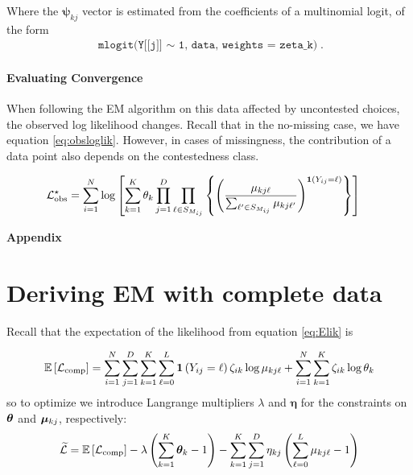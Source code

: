 \documentclass[11pt]{article}
\begin{document}
Where the \(\bm\psi_{kj}\) vector is estimated from the coefficients of a multinomial logit, of the form 
\begin{align*}
\texttt{mlogit(Y[[j]] \(\sim\) 1, data, weights = zeta\_k)}.
\end{align*}

\paragraph{Evaluating Convergence} When following the EM algorithm on this data affected by uncontested choices, the observed log likelihood changes. Recall that in the no-missing case,  we have equation \ref{eq:obsloglik}. However, in cases of missingness, the contribution of a data point also depends on the contestedness class.

\begin{align*}
{\mathcal{L}}^{\star}_{\text{obs}} &= \sum^{N}_{i=1}\log \left[\sum^{K}_{k=1}\theta_k \prod^{D}_{j=1}\prod_{\ell \in S_{M_{ij}}}\left\{\left(\frac{\mu_{kj\ell}}{\sum_{\ell^\prime \in S_{M_{ij}}} \mu_{kj\ell^\prime}}\right)^{\bm{1}\left(Y_{ij} = \ell\right)}\right\}\right]
\end{align*}


\newpage
\appendix

\begin{centering}
\textbf{\large{Appendix}}
\end{centering}

\section{Deriving EM with complete data}

Recall that the expectation of the likelihood from equation \ref{eq:Elik} is

\begin{align*}
\mathbb{E}\left[\mathcal{L}_{\text{comp}}\right] = \sum^{N}_{i=1}\sum^{D}_{j=1}\sum^{K}_{k=1}\sum^{L}_{\ell = 0}\bm{1}\left(Y_{ij} = \ell\right) \zeta_{ik}\log\mu_{kj\ell} +  
\sum^{N}_{i=1}\sum^{K}_{k=1}\zeta_{ik}\log \theta_{k}
\end{align*}
so to optimize we introduce Langrange multipliers \(\lambda\) and \(\bm{\eta}\) for the constraints on \(\bm{\theta}\) and \(\bm{\mu}_{kj}\), respectively:
\begin{align}
\widetilde{\mathcal{L}} = \mathbb{E}\left[\mathcal{L}_\text{comp}\right] - \lambda\left(\sum^{K}_{k=1}\bm{\theta}_k - 1\right) - \sum^{K}_{k=1}\sum^{D}_{j=1}\eta_{kj}\left(\sum^{L}_{\ell=0}\mu_{kj\ell} - 1\right) \nonumber
\end{align}
\end{document}
